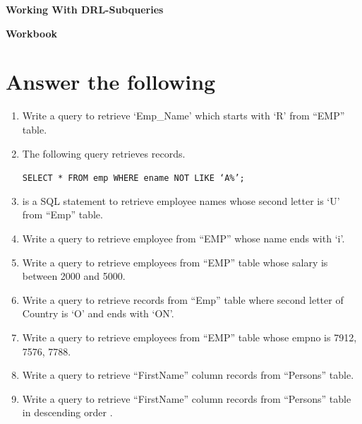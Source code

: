\documentclass[11pt,a4paper]{article}
\begin{document}
\centerline{\huge{ \textbf{Working With DRL-Subqueries}}}

\vspace{1pc}

\centerline{\Large{ \textbf{Workbook}}}
\section*{Answer the following}
\begin{enumerate}\itemsep10pt
\item  Write a query to retrieve `Emp\_Name' which starts with `R' from ``EMP'' table. \underline{\hspace{3cm}}

\item The following query retrieves \underline{\hspace{3cm}} records.

\texttt{SELECT * FROM emp WHERE ename NOT LIKE `A\%';}

\item \underline{\hspace{3cm}} is a SQL statement to retrieve employee names whose second letter is `U' from ``Emp'' table.

\item Write a query to retrieve employee from ``EMP'' whose name ends with `i'.\underline{\hspace{3cm}}

\item Write a query to retrieve employees from ``EMP'' table whose salary is between 2000 and 5000.\underline{\hspace{3cm}}

\item Write a query to retrieve records from ``Emp'' table where second letter of Country is `O' and ends with `ON'.\underline{\hspace{3cm}}

\item Write a query to retrieve employees from ``EMP'' table whose empno is 7912, 7576, 7788.\underline{\hspace{3cm}}

\item Write a query to retrieve ``FirstName'' column records from ``Persons'' table. \underline{\hspace{3cm}}

\item Write a query to retrieve ``FirstName'' column records from ``Persons'' table in descending order .\underline{\hspace{3cm}}


\end{enumerate}
\end{document}

